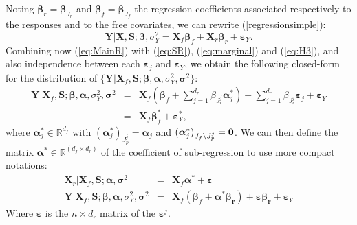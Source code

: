 \documentclass[12pt,a4paper]{report}
\begin{document}
Noting $\boldsymbol{\beta}_r=\boldsymbol{\beta}_{J_r}$ and $\boldsymbol{\beta}_f=\boldsymbol{\beta}_{J_f}$ the regression coefficients associated respectively to the responses and to the free covariates, we can rewrite (\ref{regressionsimple}):
\begin{equation}
			\boldsymbol{Y}{|\boldsymbol{X},\boldsymbol{S}};\boldsymbol{\beta},\sigma_Y^2=\boldsymbol{X}_f\boldsymbol{\beta}_f+\boldsymbol{X}_r\boldsymbol{\beta}_r+\boldsymbol{\varepsilon}_Y. \label{eq:MainR}
\end{equation}
Combining now (\ref{eq:MainR}) with (\ref{eq:SR}), (\ref{eq:marginal}) and (\ref{eq:H3}), and also independence between each $\boldsymbol{\varepsilon}_j$ and $\boldsymbol{\varepsilon}_Y$, we obtain the following closed-form for the distribution of $\{\boldsymbol{Y} |\boldsymbol{X}_f,\boldsymbol{S};\boldsymbol{\beta},\boldsymbol{\alpha},\sigma_Y^2,\boldsymbol{\sigma}^2\}$:
\begin{eqnarray}
	\boldsymbol{Y}|\boldsymbol{X}_f,\boldsymbol{S};\boldsymbol{\beta},\boldsymbol{\alpha},\sigma_Y^2,\boldsymbol{\sigma}^2&=&\boldsymbol{X}_f (\boldsymbol{\beta}_f+ \sum_{j =1}^{d_r}\beta_{J_r^j}\boldsymbol{\alpha}_j^*)+  \sum_{j =1}^{d_r}\beta_{J_r^j}\boldsymbol{\varepsilon}_j+\boldsymbol{\varepsilon}_Y \label{eq:Trueexpl} \\
	&=&\boldsymbol{X}_f\boldsymbol{\beta}_f^*+\boldsymbol{\varepsilon}_Y^*,\label{eq:modexpl}
\end{eqnarray}
where $\boldsymbol{\alpha}^*_j \in \mathbb{R}^{d_f}$ with $(\boldsymbol{\alpha}_j^*)_{J_p^j}=\boldsymbol{\alpha}_j $ and $(\boldsymbol{\alpha}_j^*)_{J_f\setminus J_p^j}=\bf 0 $. We can then define the matrix $\boldsymbol{\alpha}^* \in \mathbb{R}^{(d_f \times d_r)}$ of the coefficient of sub-regression to use more compact notations:
\begin{eqnarray}
	\boldsymbol{X}_r|\boldsymbol{X}_f,\boldsymbol{S};\boldsymbol{\alpha},\boldsymbol{\sigma}^2&=&\boldsymbol{X}_f\boldsymbol{\alpha}^*+\boldsymbol{\varepsilon} \\
	\boldsymbol{Y}|\boldsymbol{X}_f,\boldsymbol{S};\boldsymbol{\beta},\boldsymbol{\alpha},\sigma_Y^2,\boldsymbol{\sigma}^2&=&\boldsymbol{X}_f (\boldsymbol{\beta}_f+ \boldsymbol{\alpha}^*\boldsymbol{\beta_{r}})+ \boldsymbol{\varepsilon}\boldsymbol{\beta_{r}}+\boldsymbol{\varepsilon}_Y \label{eq:Trueexpl2}
\end{eqnarray} 
Where $\boldsymbol{\varepsilon}$ is the $n\times d_r$ matrix of the $\boldsymbol{\varepsilon}^j$.\\
\end{document}
